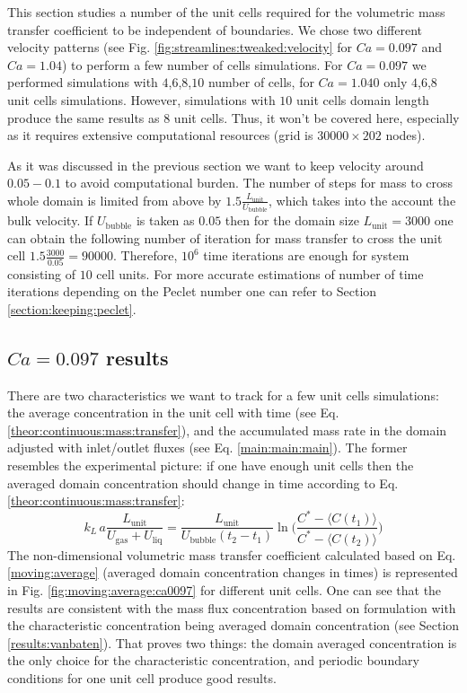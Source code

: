 \documentclass{article}
\newcommand{\beq}{\begin{equation}}
\newcommand{\feq}{\end{equation}}
\newcommand{\vol}{k_L\,a}
\newcommand{\lunit}{L_{\mathrm{unit}}}
\newcommand{\ububble}{U_{\mathrm{bubble}}}
\newcommand{\uliq}{U_{\mathrm{liq}}}
\newcommand{\ugas}{U_{\mathrm{gas}}}
\begin{document}
This section studies a number of the unit cells required for the volumetric
mass transfer coefficient to be independent of boundaries. We chose two
different
velocity patterns (see Fig. \ref{fig:streamlines:tweaked:velocity} for $Ca=0.097$ and $Ca=1.04$) to
perform a few number of cells simulations. For $Ca=0.097$ we performed simulations with
$4$,$6$,$8$,$10$ number of cells, for $Ca=1.040$ only $4$,$6$,$8$ unit cells simulations.
However,
simulations with $10$ unit cells domain length produce the same results as $8$ unit cells.
Thus, it won't be covered here, especially as it requires extensive computational resources (grid is
$30000\times 202$ nodes). 

As it was discussed in the previous section we want to keep
velocity around $0.05-0.1$ to avoid computational burden. The number of steps for mass to cross whole domain is
limited from above by $1.5 \frac{\lunit}{\ububble}$, which takes into the account the bulk
velocity. If $\ububble$ is taken as $0.05$ then for
the domain size $\lunit=3000$ one can obtain the following number of iteration for mass transfer to
cross the unit cell $1.5 \frac{3000}{0.05}=90000$. Therefore, $10^{6}$ time iterations are enough
for system consisting of $10$ cell units. For more accurate estimations of number of time
iterations depending
on the Peclet number one can refer to Section \ref{section:keeping:peclet}.

\subsection{$Ca=0.097$ results}
There are two characteristics we want to track for a few unit cells simulations: the average
concentration in
the unit cell with time (see Eq. \ref{theor:continuous:mass:transfer}), and the accumulated mass
rate in the domain adjusted with inlet/outlet fluxes (see Eq. \ref{main:main:main}). The former
resembles the experimental picture: if one have enough unit cells then the averaged domain
concentration should change in time according to Eq. \ref{theor:continuous:mass:transfer}: 
\beq
\label{moving:average}
\vol\frac{\lunit}{\ugas+\uliq}=\frac{\lunit}{\ububble (t_2
-t_1)}\ln\biggl(\frac{C^*-\langle C(t_1) \rangle}{C^*-\langle C(t_2)\rangle}\biggr)
\feq
The non-dimensional volumetric mass transfer coefficient calculated based on Eq.
\ref{moving:average} (averaged domain concentration changes in times) is
represented in Fig. \ref{fig:moving:average:ca0097} for different unit cells. One can see that the
results are consistent with the mass flux
concentration based on \citeauthor{vanbaten-circular} formulation with the characteristic
concentration being averaged domain concentration (see Section \ref{results:vanbaten}). That proves two things:  the domain averaged concentration is the only choice for the characteristic concentration, and periodic boundary conditions for one unit cell produce good results.
\end{document}
